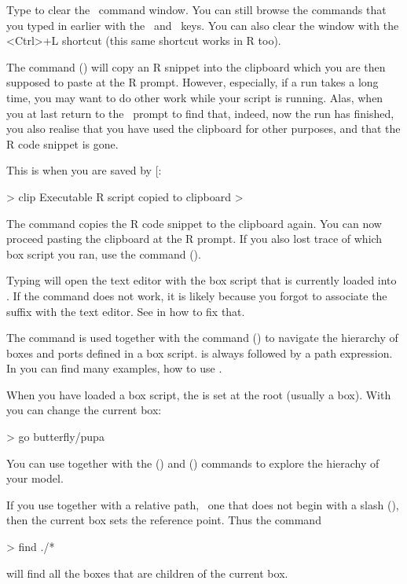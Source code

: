 Type  to clear the \US\ command window. You can still browse the commands that you typed in earlier with the \upkey\ and  \downkey\ keys. You can also clear the window with the <Ctrl>+L shortcut (this same shortcut works in R too).

The  command () will copy an R snippet into the clipboard which you are then supposed to paste at the R prompt. However, especially, if a run takes a long time, you may want to do other work while your script is running. Alas, when you at last return to the \US\ prompt to find that, indeed, now the run has finished, you also realise that you have used the clipboard for other purposes, and that the R code snippet is gone.

This is when you are saved by [:
\begin{usdialog}
> clip
Executable R script copied to clipboard
>
\end{usdialog}
The  command copies the R code snippet to the clipboard again. You can now proceed pasting the clipboard at the R prompt. If you also lost trace of which box script you ran, use the  command ().

Typing  will open the text editor with the box script that is currently loaded into \US. If the command does not work, it is likely because you forgot to associate the  suffix with the text editor. See in  how to fix that.

The  command is used together with the  command () to navigate the hierarchy of boxes and ports defined in a box script.  is always followed by a path expression. In  you can find many examples, how to use .

When you have loaded a box script, the  is set at the root (usually a  box). With  you can change the current box:
\begin{usdialog}
> go butterfly/pupa
\end{usdialog}
You can use  together with the  () and  () commands to explore the hierachy of your model. 

If you use  together with a relative path, \ie\ one that does not begin with a slash (\code{/}), then the current box sets the reference point. Thus the command
\begin{usdialog}
> find ./*
\end{usdialog}
will find all the boxes that are children of the current box.

